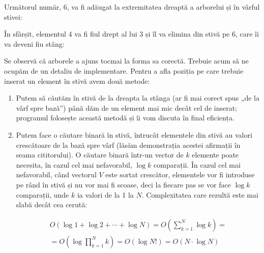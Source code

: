 Următorul număr, 6, va fi adăugat la extremitatea dreaptă a arborelui și în
vârful stivei:


În sfârșit, elementul 4 va fi fiul drept al lui 3 și îl va elimina din stivă
pe 6, care îi va deveni fiu stâng:


Se observă că arborele a ajuns tocmai la forma sa corectă. Trebuie acum să ne
ocupăm de un detaliu de implementare. Pentru a afla poziția pe care trebuie
inserat un element în stivă avem două metode:

\begin{enumerate}

\item Putem să căutăm în stivă de la dreapta la stânga (ar fi mai corect spus
  „de la vârf spre bază”) până dăm de un element mai mic decât cel de inserat;
  programul folosește această metodă și îi vom discuta în final eficiența.

\item Putem face o căutare binară în stivă, întrucât elementele din stivă au
  valori crescătoare de la bază spre vârf (lăsăm demonstrația acestei
  afirmații în seama cititorului). O căutare binară într-un vector de $k$
  elemente poate necesita, în cazul cel mai nefavorabil, $\log k$
  comparații. În cazul cel mai nefavorabil, când vectorul $V$ este sortat
  crescător, elementele vor fi introduse pe rând în stivă și nu vor mai fi
  scoase, deci la fiecare pas se vor face $\log k$ comparații, unde $k$ ia
  valori de la 1 la $N$. Complexitatea care rezultă este mai slabă decât cea
  cerută:

  \begin{equation}
    \begin{split}
      O(\log 1 + \log 2 + \cdots + \log N) = O(\sum_{k = 1}^{N} \log k) = \\
      = O(\log \prod_{k = 1}^{N} k) = O(\log N!) = O(N \cdot \log N)
    \end{split}
  \end{equation}

\end{enumerate}

